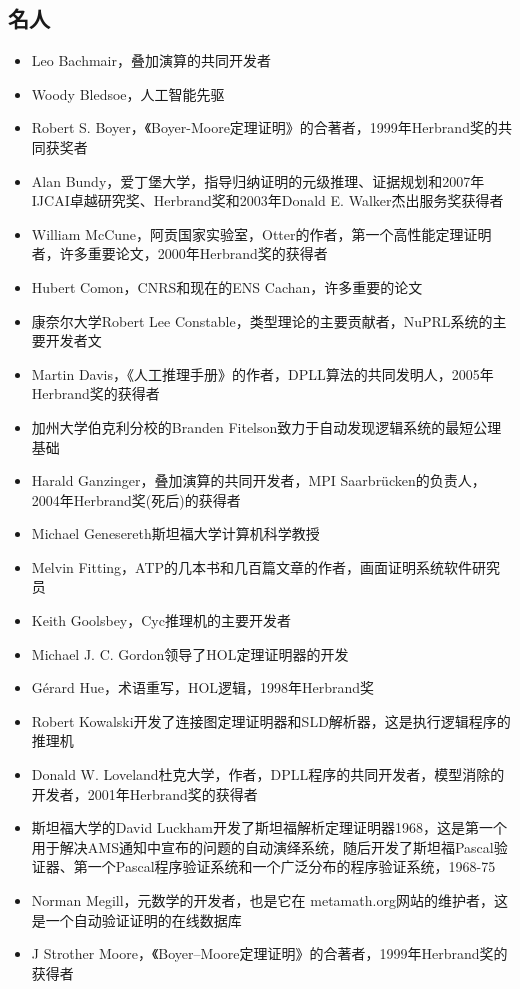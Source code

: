 \subsection{名人}
\begin{itemize}
\item Leo Bachmair，叠加演算的共同开发者
\item Woody Bledsoe，人工智能先驱
\item Robert S. Boyer，《Boyer-Moore定理证明》的合著者，1999年Herbrand奖的共同获奖者
\item Alan Bundy，爱丁堡大学，指导归纳证明的元级推理、证据规划和2007年IJCAI卓越研究奖、Herbrand奖和2003年Donald E. Walker杰出服务奖获得者
\item William McCune，阿贡国家实验室，Otter的作者，第一个高性能定理证明者，许多重要论文，2000年Herbrand奖的获得者
\item Hubert Comon，CNRS和现在的ENS Cachan，许多重要的论文
\item 康奈尔大学Robert Lee Constable，类型理论的主要贡献者，NuPRL系统的主要开发者文
\item Martin Davis，《人工推理手册》的作者，DPLL算法的共同发明人，2005年Herbrand奖的获得者
\item 加州大学伯克利分校的Branden Fitelson致力于自动发现逻辑系统的最短公理基础
\item Harald Ganzinger，叠加演算的共同开发者，MPI Saarbrücken的负责人，2004年Herbrand奖(死后)的获得者
\item Michael Genesereth斯坦福大学计算机科学教授
\item Melvin Fitting，ATP的几本书和几百篇文章的作者，画面证明系统软件研究员
\item Keith Goolsbey，Cyc推理机的主要开发者
\item Michael J. C. Gordon领导了HOL定理证明器的开发
\item Gérard Hue，术语重写，HOL逻辑，1998年Herbrand奖
\item Robert Kowalski开发了连接图定理证明器和SLD解析器，这是执行逻辑程序的推理机
\item Donald W. Loveland杜克大学，作者，DPLL程序的共同开发者，模型消除的开发者，2001年Herbrand奖的获得者
\item 斯坦福大学的David Luckham开发了斯坦福解析定理证明器1968，这是第一个用于解决AMS通知中宣布的问题的自动演绎系统，随后开发了斯坦福Pascal验证器、第一个Pascal程序验证系统和一个广泛分布的程序验证系统，1968-75
\item Norman Megill，元数学的开发者，也是它在 metamath.org网站的维护者，这是一个自动验证证明的在线数据库
\item J Strother Moore，《Boyer–Moore定理证明》的合著者，1999年Herbrand奖的获得者

\end{itemize}

